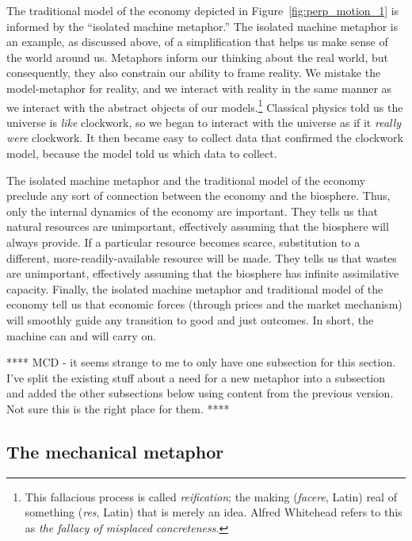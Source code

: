 The traditional model of the economy depicted in Figure~\ref{fig:perp_motion_1} 
is informed by the ``isolated machine metaphor.''
The isolated machine metaphor is an example, as discussed above, 
of a simplification that helps us make sense of the world around us.
Metaphors inform our thinking about the real world,
but consequently,
they also constrain our ability to frame reality.
We mistake the model-metaphor for reality, and
we interact with reality in the same manner 
as we interact with the abstract objects of our
models.\footnote{This fallacious process is called
	\emph{reification}; the making (\emph{facere}, Latin) real of
	something (\emph{res}, Latin) that is merely an idea.
	Alfred Whitehead refers to this as
	\emph{the fallacy of misplaced concreteness}.\cite{Whitehead2011}}
Classical physics told us the universe is
\emph{like} clockwork, 
so we began to interact with the universe
as if it \emph{really were} clockwork.
It then became easy to collect data that confirmed the clockwork model,
because the model told us which data to collect.

The isolated machine metaphor and the traditional model of the economy
preclude any sort of connection 
between the economy and the biosphere.
Thus, only the internal dynamics of the economy are important. 
They tells us that natural resources are unimportant, effectively assuming 
that the biosphere will always provide.
If a particular resource becomes scarce, 
substitution to a different, more-readily-available resource will be made.
They tells us that wastes are unimportant, effectively assuming that the biosphere
has infinite assimilative capacity.
Finally, the isolated machine metaphor and traditional model of the economy 
tell us that economic forces 
(through prices and the market mechanism) will smoothly guide any transition
to good and just outcomes.
In short, the machine can and will carry on.

**** MCD - it seems strange to me to only have one subsection for this section. 
I've split the existing stuff about a need for a new metaphor into a subsection
and added the other subsections below using content from the previous version.
Not sure this is the right place for them.
****

\subsection{The mechanical metaphor}
\label{sec:mechanical_metaphor}


